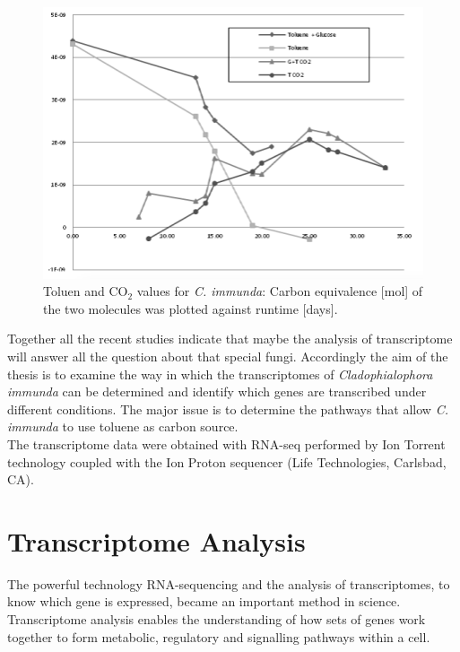 \documentclass[12pt, a4paper]{report}
\begin{document}
\begin{figure}[H]
	\centering	
	\includegraphics[width=400pt]{pics/GCresults.png}
	\caption[Toluen and CO$_2$ values for \textit{C. immunda}]
	{Toluen and CO$_2$ values for \textit{C. immunda}: Carbon equivalence [mol] of the two molecules was plotted against runtime [days]. \cite{Poyntner2014}}
	\label{GCresults}
\end{figure}

Together all the recent studies indicate that maybe the analysis of transcriptome will answer all the question about that special fungi.
Accordingly the aim of the thesis is to examine the way in which the transcriptomes of \textit{Cladophialophora immunda} can be determined and identify which genes are transcribed under different conditions. The major issue is to determine the pathways that allow \textit{C. immunda} to use toluene as carbon source.\\ 
The transcriptome data were obtained with RNA-seq performed by Ion Torrent technology coupled with the Ion Proton sequencer (Life Technologies, Carlsbad, CA). \cite{BarbaraBlasi2015}

\section{Transcriptome Analysis}
The powerful technology RNA-sequencing and the analysis of transcriptomes, to know which gene is expressed, became an important method in science. Transcriptome analysis enables the understanding of how sets of genes work together to form metabolic, regulatory and signalling pathways within a cell. \cite{Xiong2006} 
\end{document}
